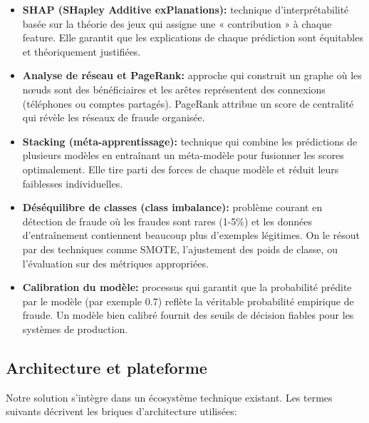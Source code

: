 \documentclass[a4paper, oneside, 12pt]{book}
\begin{document}
\begin{itemize}[label=\textbullet]
    \item \textbf{SHAP (SHapley Additive exPlanations):} technique d'interprétabilité 
    basée sur la théorie des jeux qui assigne une « contribution » à chaque feature. 
    Elle garantit que les explications de chaque prédiction sont équitables et 
    théoriquement justifiées.

    \item \textbf{Analyse de réseau et PageRank:} approche qui construit un graphe 
    où les nœuds sont des bénéficiaires et les arêtes représentent des connexions 
    (téléphones ou comptes partagés). PageRank attribue un score de centralité qui 
    révèle les réseaux de fraude organisée.

    \item \textbf{Stacking (méta-apprentissage):} technique qui combine les 
    prédictions de plusieurs modèles en entraînant un méta-modèle pour fusionner les 
    scores optimalement. Elle tire parti des forces de chaque modèle et réduit leurs 
    faiblesses individuelles.

    \item \textbf{Déséquilibre de classes (class imbalance):} problème courant en 
    détection de fraude où les fraudes sont rares (1-5\%) et les données 
    d'entraînement contiennent beaucoup plus d'exemples légitimes. On le résout par 
    des techniques comme SMOTE, l'ajustement des poids de classe, ou l'évaluation 
    sur des métriques appropriées.

    \item \textbf{Calibration du modèle:} processus qui garantit que la probabilité 
    prédite par le modèle (par exemple 0.7) reflète la véritable probabilité empirique 
    de fraude. Un modèle bien calibré fournit des seuils de décision fiables pour 
    les systèmes de production.

\end{itemize}


\subsection{Architecture et plateforme}

\hspace{0.5cm}Notre solution s'intègre dans un écosystème technique existant. Les termes suivants décrivent les briques d'architecture utilisées:
\end{document}
